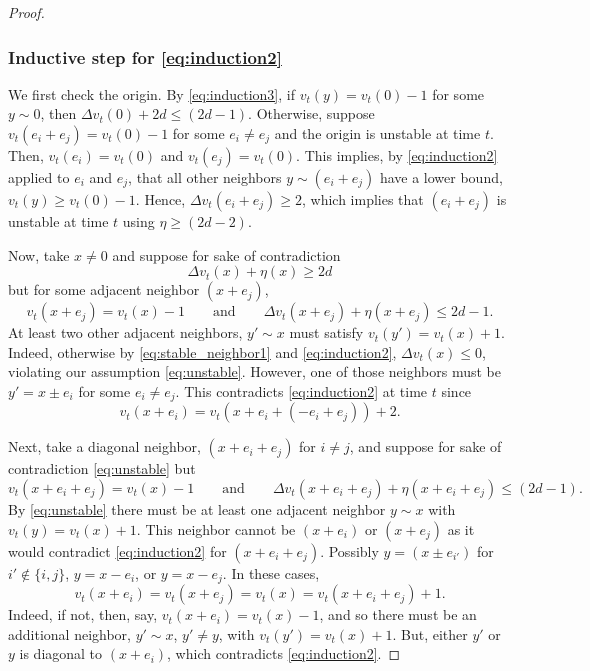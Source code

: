\documentclass[aap]{imsart}
\begin{document}
\begin{proof}
	\subsubsection*{Inductive step for \eqref{eq:induction2}}
	We first check the origin. By \eqref{eq:induction3}, if $v_t(y) = v_t(0)-1$
	for some $y \sim 0$, then $\Delta v_t(0) + 2 d \leq (2 d -1)$. Otherwise, 
	suppose $v_t(e_i + e_j) = v_t(0) - 1$ for some $e_i \not = e_j$ and the origin is unstable at time $t$. Then,
	$v_t(e_i) = v_t(0)$ and $v_t(e_j) = v_t(0)$. This implies, by \eqref{eq:induction2} applied to $e_i$ and $e_j$, that all other neighbors $y \sim (e_i + e_j)$ have a lower bound, $v_t(y) \geq v_t(0) - 1$. 
	Hence, $\Delta v_t(e_i + e_j) \geq 2$, which implies that $(e_i+e_j)$ is unstable at time $t$
	using $\eta \geq (2 d - 2)$. 
	
	Now, take $x \not = 0$ and suppose for sake of contradiction 
	\begin{equation} \label{eq:unstable}
	\Delta v_t(x) + \eta(x) \geq 2 d
	\end{equation}
	but for some adjacent neighbor $(x + e_j)$,  
	\begin{equation} \label{eq:stable_neighbor1}
	v_t(x+e_j) = v_t(x) - 1 \qquad \mbox{and} \qquad  \Delta v_t(x+e_j) + \eta(x+e_j) \leq 2 d -1.
	\end{equation}
	At least two other adjacent neighbors, $y' \sim x$ must satisfy $v_t(y') = v_t(x) + 1$.
	Indeed, otherwise by \eqref{eq:stable_neighbor1} and \eqref{eq:induction2},	 $\Delta v_t(x) \leq 0$, violating
	our assumption \eqref{eq:unstable}. However, one of those neighbors must be 
	$y' = x \pm e_i$ for some $e_i \not= e_j$. This contradicts
	\eqref{eq:induction2} at time $t$ since 
	\[
	v_t(x + e_i) = v_t(x + e_i + (-e_i + e_j)) + 2.
	\]
	
	Next, take a diagonal neighbor,  $(x + e_i + e_j)$ for $i \not = j$, and suppose for sake of contradiction \eqref{eq:unstable}
	but
	\begin{equation} \label{eq:stable_neighbor2}
	v_t(x+e_i+e_j) = v_t(x) - 1 \qquad \mbox{and} \qquad  \Delta v_t(x+e_i+e_j) + \eta(x+e_i+e_j) \leq (2 d -1).
	\end{equation}
	By \eqref{eq:unstable} there must be at least one adjacent neighbor $y \sim x$ with $v_t(y) = v_t(x) + 1$.
	This neighbor cannot be $(x+e_i)$ or $(x+e_j)$ as it would contradict \eqref{eq:induction2} for $(x+e_i+e_j)$.
	Possibly $y  = (x \pm e_{i'})$ for $i' \not \in \{ i,j\}$,  $y = x - e_i$, or $y = x - e_j$.
	In these cases, 
	\begin{equation} \label{eq:large_neighbors}
	v_t(x + e_i) = v_t(x+e_j) = v_t(x) = v_t(x+e_i+e_j) + 1.
	\end{equation}
	Indeed, if not, then, say, $v_t(x+e_i) = v_t(x) - 1$, and so there must be an additional neighbor, 
	$y' \sim x$, $y' \not = y$, with $v_t(y') = v_t(x) + 1$.  But, either $y'$ or $y$ is diagonal to $(x + e_i)$, 
	which contradicts \eqref{eq:induction2}. 
	

\end{proof}
\end{document}
